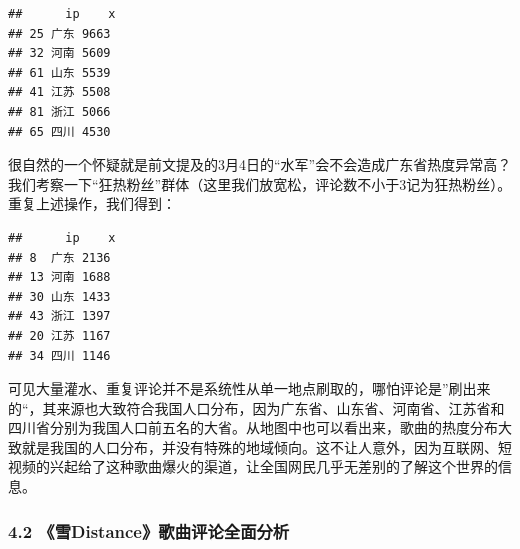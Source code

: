 \documentclass[
]{article}
\newenvironment{Shaded}{\begin{snugshade}}{\end{snugshade}}
\newcommand{\AttributeTok}[1]{\textcolor[rgb]{0.77,0.63,0.00}{#1}}
\newcommand{\ConstantTok}[1]{\textcolor[rgb]{0.00,0.00,0.00}{#1}}
\newcommand{\DecValTok}[1]{\textcolor[rgb]{0.00,0.00,0.81}{#1}}
\newcommand{\FunctionTok}[1]{\textcolor[rgb]{0.00,0.00,0.00}{#1}}
\newcommand{\NormalTok}[1]{#1}
\newcommand{\OtherTok}[1]{\textcolor[rgb]{0.56,0.35,0.01}{#1}}
\newcommand{\SpecialCharTok}[1]{\textcolor[rgb]{0.00,0.00,0.00}{#1}}
\newcommand{\StringTok}[1]{\textcolor[rgb]{0.31,0.60,0.02}{#1}}
\begin{document}
\begin{verbatim}
##      ip    x
## 25 广东 9663
## 32 河南 5609
## 61 山东 5539
## 41 江苏 5508
## 81 浙江 5066
## 65 四川 4530
\end{verbatim}

很自然的一个怀疑就是前文提及的3月4日的``水军''会不会造成广东省热度异常高？我们考察一下``狂热粉丝''群体（这里我们放宽松，评论数不小于3记为狂热粉丝）。重复上述操作，我们得到：

\begin{Shaded}
\end{Shaded}

\begin{verbatim}
##      ip    x
## 8  广东 2136
## 13 河南 1688
## 30 山东 1433
## 43 浙江 1397
## 20 江苏 1167
## 34 四川 1146
\end{verbatim}

可见大量灌水、重复评论并不是系统性从单一地点刷取的，哪怕评论是''刷出来的``，其来源也大致符合我国人口分布，因为广东省、山东省、河南省、江苏省和四川省分别为我国人口前五名的大省。从地图中也可以看出来，歌曲的热度分布大致就是我国的人口分布，并没有特殊的地域倾向。这不让人意外，因为互联网、短视频的兴起给了这种歌曲爆火的渠道，让全国网民几乎无差别的了解这个世界的信息。

\hypertarget{ux96eadistanceux6b4cux66f2ux8bc4ux8bbaux5168ux9762ux5206ux6790-1}{%
\subsubsection{4.2
《雪Distance》歌曲评论全面分析}\label{ux96eadistanceux6b4cux66f2ux8bc4ux8bbaux5168ux9762ux5206ux6790-1}}
\end{document}
